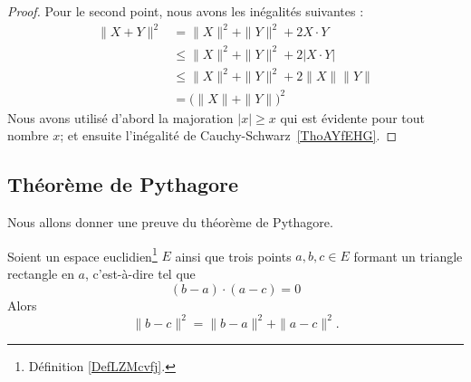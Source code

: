 \begin{proof}
    Pour le second point, nous avons les inégalités suivantes :
	\begin{subequations}
		\begin{align}
			\| X+Y \|^2&=\| X \|^2+\| Y \|^2+2X\cdot Y\\
			&\leq\| X \|^2+\| Y \|^2+2|X\cdot Y|\\
			&\leq\| X \|^2+\| Y \|^2+2\| X \|\| Y \|\\
			&=\big( \| X \|+\| Y \| \big)^2
		\end{align}
	\end{subequations}
    Nous avons utilisé d'abord la majoration $| x |\geq x$ qui est évidente pour tout nombre $x$; et ensuite l'inégalité de Cauchy-Schwarz~\ref{ThoAYfEHG}.
\end{proof}

\subsection{Théorème de Pythagore}

Nous allons donner une preuve du théorème de Pythagore.

\begin{theorem}     \label{THOooHXHWooCpcDan}
    Soient un espace euclidien\footnote{Définition \ref{DefLZMcvfj}.} \( E\) ainsi que trois points \( a,b,c\in E\) formant un triangle rectangle en \( a\), c'est-à-dire tel que
    \begin{equation}        \label{EQooRAWAooBxlBcZ}
        (b-a)\cdot (a-c)=0
    \end{equation}
    Alors
    \begin{equation}
        \| b-c \|^2=\| b-a \|^2+\| a-c \|^2.
    \end{equation}
\end{theorem}

